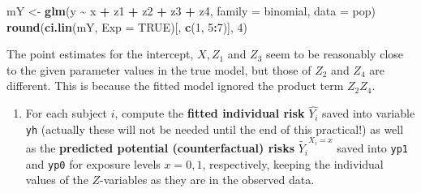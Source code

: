 \documentclass[
]{book}
\newenvironment{Shaded}{\begin{snugshade}}{\end{snugshade}}
\newcommand{\AttributeTok}[1]{\textcolor[rgb]{0.13,0.29,0.53}{#1}}
\newcommand{\ConstantTok}[1]{\textcolor[rgb]{0.56,0.35,0.01}{#1}}
\newcommand{\DecValTok}[1]{\textcolor[rgb]{0.00,0.00,0.81}{#1}}
\newcommand{\FunctionTok}[1]{\textcolor[rgb]{0.13,0.29,0.53}{\textbf{#1}}}
\newcommand{\NormalTok}[1]{#1}
\newcommand{\OtherTok}[1]{\textcolor[rgb]{0.56,0.35,0.01}{#1}}
\newcommand{\SpecialCharTok}[1]{\textcolor[rgb]{0.81,0.36,0.00}{\textbf{#1}}}
\providecommand{\tightlist}{%
  \setlength{\itemsep}{0pt}\setlength{\parskip}{0pt}}
\begin{document}
\begin{Shaded}
\begin{Highlighting}[]
\NormalTok{mY }\OtherTok{\textless{}{-}} \FunctionTok{glm}\NormalTok{(y }\SpecialCharTok{\textasciitilde{}}\NormalTok{ x }\SpecialCharTok{+}\NormalTok{ z1 }\SpecialCharTok{+}\NormalTok{ z2 }\SpecialCharTok{+}\NormalTok{ z3 }\SpecialCharTok{+}\NormalTok{ z4, }\AttributeTok{family =}\NormalTok{ binomial, }\AttributeTok{data =}\NormalTok{ pop)}
\FunctionTok{round}\NormalTok{(}\FunctionTok{ci.lin}\NormalTok{(mY, }\AttributeTok{Exp =} \ConstantTok{TRUE}\NormalTok{)[, }\FunctionTok{c}\NormalTok{(}\DecValTok{1}\NormalTok{, }\DecValTok{5}\SpecialCharTok{:}\DecValTok{7}\NormalTok{)], }\DecValTok{4}\NormalTok{)}
\end{Highlighting}
\end{Shaded}

The point estimates for the intercept, \(X, Z_1\) and \(Z_3\) seem to be
reasonably close to the given parameter values in the true model, but
those of \(Z_2\) and \(Z_4\) are different. This is because the fitted model
ignored the product term \(Z_2 Z_4\).

\begin{enumerate}
\def\labelenumi{\arabic{enumi}.}
\setcounter{enumi}{1}
\tightlist
\item
  For each subject \(i\), compute the \textbf{fitted individual risk}
  \(\widehat{Y_i}\) saved into variable \texttt{yh} (actually these will not be
  needed until the end of this practical!) as well as the
  \textbf{predicted potential (counterfactual) risks}
  \(\widetilde{Y_i}^{X_i=x}\) saved into \texttt{yp1} and \texttt{yp0} for exposure
  levels \(x=0,1\), respectively, keeping the individual values of the
  \(Z\)-variables as they are in the observed data.
\end{enumerate}
\end{document}
